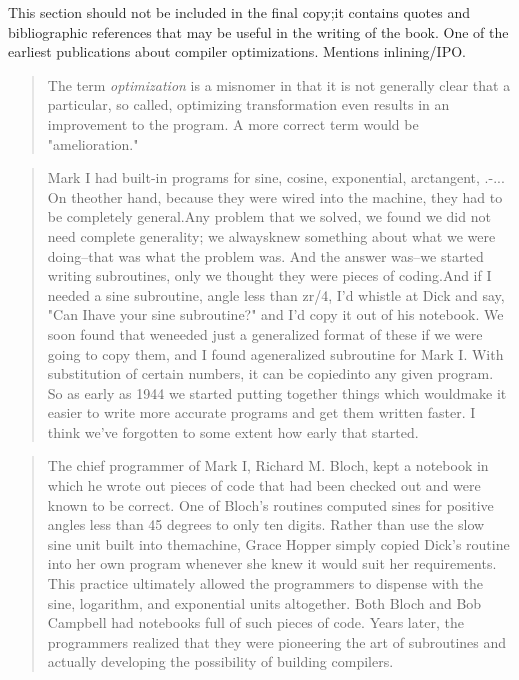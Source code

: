 This section should not be included in the final copy;it contains quotes and
bibliographic references that may be useful in the writing of the
book.\vspace{1em}
One of the earliest publications about compiler optimizations. Mentions
inlining/IPO.
\begin{quotation}
	The term \textit{optimization}
	is a misnomer in that it is not generally clear that a particular, so called,
	optimizing transformation even results in an improvement to the program. A more
	correct term would be "amelioration."
\end{quotation}
\begin{quotation}
	Mark I had built-in programs for sine, cosine, exponential, arctangent,
	.-... On theother hand, because they were wired into the machine, they had to
	be completely general.Any problem that we solved, we found we did not need
	complete generality; we alwaysknew something about what we were doing--that was
	what the problem was. And the answer was--we started writing subroutines, only
	we thought they were pieces of coding.And if I needed a sine subroutine, angle
	less than zr/4, I'd whistle at Dick and say, "Can Ihave your sine subroutine?"
	and I'd copy it out of his notebook. We soon found that weneeded just a
	generalized format of these if we were going to copy them, and I found
	ageneralized subroutine for Mark I. With substitution of certain numbers, it
	can be copiedinto any given program. So as early as 1944 we started putting
	together things which wouldmake it easier to write more accurate programs and
	get them written faster. I think we've forgotten to some extent how early that
	started.
\end{quotation}
\begin{quotation}
	The chief programmer of Mark I, Richard M. Bloch, kept a notebook in which he
	wrote out pieces of code that had been checked out and were known to be correct.
	One of Bloch's routines computed sines for positive angles less than 45 degrees
	to only ten digits. Rather than use the slow sine unit built into themachine,
	Grace Hopper simply copied Dick's routine into her own program whenever she
	knew it would suit her requirements. This practice ultimately allowed the
	programmers to dispense with the sine, logarithm, and exponential units
	altogether. Both Bloch and Bob Campbell had notebooks full of such pieces of
	code. Years later, the programmers realized that they were pioneering the art of
	subroutines and actually developing the possibility of building compilers.
\end{quotation}

